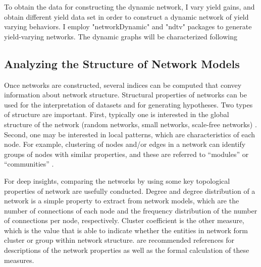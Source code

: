To obtain the data for constructing the dynamic network, I vary yield gains, and obtain different yield data set in order to construct a dynamic network of yield varying behaviors. I employ "networkDynamic"  and "ndtv"  packages to generate yield-varying networks. The dynamic graphs will be characterized following 



\subsection*{Analyzing the Structure of Network Models}

Once networks are constructed, several indices can be computed that convey information about network structure. Structural properties of networks can be used for the interpretation of datasets and for generating hypotheses. Two types of structure are important. First, typically one is interested in the global structure of the network (random networks, small networks, scale-free networks) . Second, one may be interested in local patterns, which are characteristics of each node. For example, clustering of nodes and/or edges in a network can identify groups of nodes with similar properties, and these are referred to ``modules'' or ``communities''  .

For deep insights, comparing the networks by using some key topological properties of network are usefully conducted. Degree and degree distribution of a network is a simple property to extract from network models, which are the number of connections of each node and the frequency distribution of the number of connections per node, respectively. Cluster coefficient is the other measure, which is the value that is able to indicate whether the entities in network form cluster or group within network structure.  are recommended references for descriptions of the network properties as well as the formal calculation of these measures.




